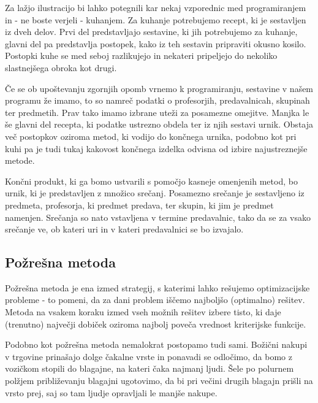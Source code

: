 \documentclass[a4paper,10pt]{article}
\begin{document}
Za lažjo ilustracijo bi lahko potegnili kar nekaj vzporednic med programiranjem in - ne
boste verjeli - kuhanjem. Za kuhanje potrebujemo recept, ki je sestavljen iz dveh delov.
Prvi del predstavljajo sestavine, ki jih potrebujemo za kuhanje, glavni del pa predstavlja
postopek, kako iz teh sestavin pripraviti okusno kosilo. Postopki kuhe se med seboj
razlikujejo in nekateri pripeljejo do nekoliko slastnejšega obroka kot drugi.

Če se ob upoštevanju zgornjih opomb vrnemo k programiranju, sestavine v našem programu že
imamo, to so namreč podatki o profesorjih, predavalnicah, skupinah ter predmetih. Prav tako
imamo izbrane uteži za posamezne omejitve. Manjka le še glavni del recepta, ki podatke
ustrezno obdela ter iz njih sestavi urnik. Obstaja več postopkov oziroma metod, ki vodijo
do končnega urnika, podobno kot pri kuhi pa je tudi tukaj kakovost končnega izdelka odvisna
od izbire najustreznejše metode.

Končni produkt, ki ga bomo ustvarili s pomočjo kasneje omenjenih metod, bo urnik, ki je
predstavljen z množico srečanj. Posamezno srečanje je sestavljeno iz predmeta,
profesorja, ki predmet predava, ter skupin, ki jim je predmet namenjen. Srečanja so nato
vstavljena v termine predavalnic, tako da se za vsako srečanje ve, ob kateri uri in v
kateri predavalnici se bo izvajalo.
\subsection{Požrešna metoda}
Požrešna metoda je ena izmed strategij, s katerimi lahko rešujemo optimizacijske probleme -
to pomeni, da za dani problem iščemo najboljšo (optimalno) rešitev. Metoda na vsakem koraku
izmed vseh možnih rešitev izbere  tisto, ki daje (trenutno) največji dobiček oziroma najbolj
poveča vrednost kriterijske funkcije.

Podobno kot požrešna metoda nemalokrat postopamo tudi sami. Božični nakupi v trgovine
prinašajo dolge čakalne vrste in ponavadi se odločimo, da bomo z vozičkom stopili do blagajne,
na kateri čaka najmanj ljudi. Šele po polurnem polžjem približevanju blagajni ugotovimo,
da bi pri večini drugih blagajn prišli na vrsto prej, saj so tam ljudje opravljali le
manjše nakupe.
\end{document}
